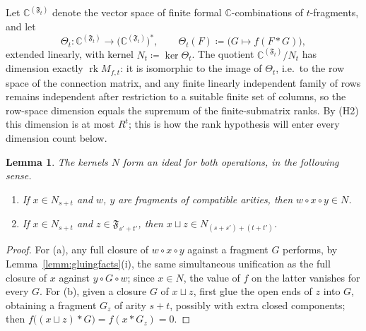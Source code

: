\documentclass[11pt]{article}
\newtheorem{lemm}[theo]{Lemma}
\newcommand{\Frag}[1]{\mathfrak{F}_{#1}}          %
\newcommand{\connmat}[2]{M_{#1,#2}}               %
\newcommand{\glue}{\ast}                          %
\newcommand{\rk}{\operatorname{rk}}
\begin{document}
Let $\mathbb{C}^{(\Frag{t})}$ denote the vector space of finite
formal $\mathbb{C}$-combinations of $t$-fragments, and let
\[
\Theta_{t}\colon\mathbb{C}^{(\Frag{t})}\to
\bigl(\mathbb{C}^{(\Frag{t})}\bigr)^{*},
\qquad
\Theta_{t}(F)\coloneqq\bigl(G\mapsto f(F\glue G)\bigr),
\]
extended linearly, with kernel
$N_{t}\coloneqq\ker\Theta_{t}$. The quotient
$\mathbb{C}^{(\Frag{t})}/N_{t}$ has dimension exactly
$\rk\connmat{f}{t}$: it is isomorphic to the image of $\Theta_{t}$,
i.e.\ to the row space of the connection matrix, and any finite
linearly independent family of rows remains independent after
restriction to a suitable finite set of columns, so the row-space
dimension equals the supremum of the finite-submatrix ranks. By
(H2) this dimension is at most $R^{t}$; this is how the rank
hypothesis will enter every dimension count below.

\begin{lemm}\label{lemm:ideal}
The kernels $N$ form an ideal for both operations, in the following
sense.
\begin{enumerate}
\item[(a)] If $x\in N_{s+t}$ and $w$, $y$ are fragments of
  compatible arities, then $w\circ x\circ y\in N$.
\item[(b)] If $x\in N_{s+t}$ and $z\in\Frag{s'+t'}$, then
  $x\sqcup z\in N_{(s+s')+(t+t')}$.
\end{enumerate}
\end{lemm}

\begin{proof}
For (a), any full closure of $w\circ x\circ y$ against a fragment
$G$ performs, by Lemma~\ref{lemm:gluingfacts}(i), the same
simultaneous unification as the full closure of $x$ against
$y\circ G\circ w$; since $x\in N$, the value of $f$ on the latter
vanishes for every $G$. For (b), given a closure $G$ of
$x\sqcup z$, first glue the open ends of $z$ into $G$, obtaining a
fragment $G_{z}$ of arity $s+t$, possibly with extra closed
components; then
$f\bigl((x\sqcup z)\glue G\bigr)=f(x\glue G_{z})=0$.
\end{proof}
\end{document}
